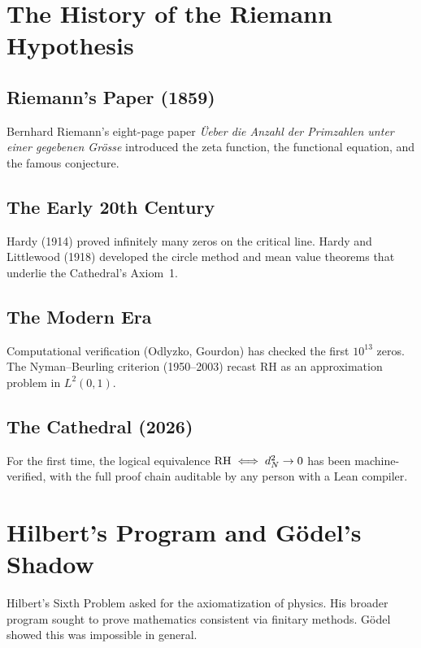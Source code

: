 \documentclass[11pt,a4paper]{article}
\begin{document}
\section{The History of the Riemann Hypothesis}

\subsection{Riemann's Paper (1859)}

Bernhard Riemann's eight-page paper \emph{\"Ueber die Anzahl der
Primzahlen unter einer gegebenen Gr\"osse} introduced the zeta
function, the functional equation, and the famous conjecture.

\subsection{The Early 20th Century}

Hardy (1914) proved infinitely many zeros on the critical line.
Hardy and Littlewood (1918) developed the circle method and mean
value theorems that underlie the Cathedral's Axiom~1.

\subsection{The Modern Era}

Computational verification (Odlyzko, Gourdon) has checked the first
$10^{13}$ zeros. The Nyman--Beurling criterion (1950--2003) recast RH
as an approximation problem in $L^2(0,1)$.

\subsection{The Cathedral (2026)}

For the first time, the logical equivalence $\mathrm{RH} \iff d_N^2 \to 0$
has been machine-verified, with the full proof chain auditable by
any person with a Lean compiler.

\section{Hilbert's Program and G\"odel's Shadow}

Hilbert's Sixth Problem asked for the axiomatization of physics.
His broader program sought to prove mathematics consistent via
finitary methods. G\"odel showed this was impossible in general.
\end{document}
